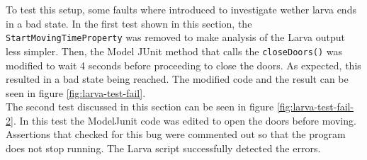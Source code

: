 \documentclass[a4paper, 12pt]{article}
\begin{document}
To test this setup, some faults where introduced to investigate wether larva ends in a bad state. In the first test shown in this section, the \texttt{StartMovingTimeProperty} was removed to make analysis of the Larva output less simpler. Then, the Model JUnit method that calls the \texttt{closeDoors()} was modified to wait 4 seconds before proceeding to close the doors. As expected, this resulted in a bad state being reached. The modified code and the result can be seen in figure \ref{fig:larva-test-fail}. \\

The second test discussed in this section can be seen in figure \ref{fig:larva-test-fail-2}. In this test the ModelJunit code was edited to open the doors before moving. Assertions that checked for this bug were commented out so that the program does not stop running. The Larva script successfully detected the errors. \\
\end{document}
